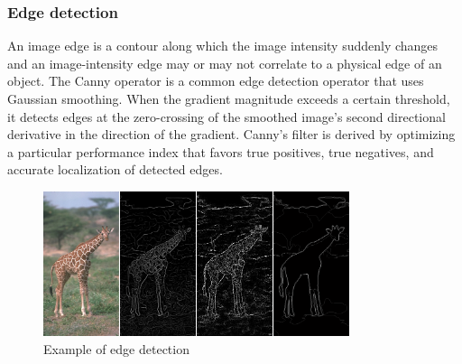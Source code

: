 \subsubsection*{Edge detection} 
An image edge is a contour along which the image intensity suddenly changes and an image-intensity edge may or may not correlate to a physical edge of an object. The Canny operator\cite{nalwa_edge_1993} is a common edge detection operator that uses Gaussian smoothing. When the gradient magnitude exceeds a certain threshold, it detects edges at the zero-crossing of the smoothed image's second directional derivative in the direction of the gradient. Canny's filter is derived by optimizing a particular performance index that favors true positives, true negatives, and accurate localization of detected edges.

\begin{figure}[ht]
    \centering
    \includegraphics[width=0.8\textwidth]{graphics/canny.png}
    \caption{Example of edge detection \cite{nalwa_edge_1993}}
    \label{fig:edgedetection}
\end{figure}








